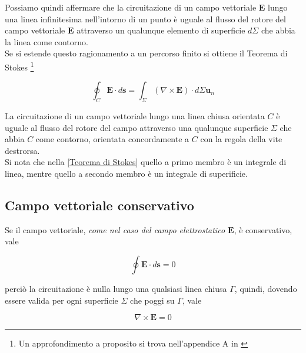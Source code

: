 Possiamo quindi affermare che la circuitazione di un campo vettoriale $\mathbf{E}$ lungo una linea infinitesima nell'intorno di un punto è uguale al flusso del rotore del campo vettoriale $\mathbf{E}$ attraverso un qualunque elemento di superficie $d \Sigma$ che abbia la linea come contorno. \\


Se si estende questo ragionamento  a un percorso finito si ottiene il Teorema di Stokes  \footnote{Un approfondimento a proposito si trova nell'appendice A in \cite{ElettromagnetismoeOnde}} 

\begin{tcolorbox}[colback=yellow!10!white, colframe=orange!70!black, boxrule=0.8pt]
\begin{equation}
    \oint_C \mathbf{E} \cdot d\mathbf{s} = \int_{\Sigma} (\nabla \times \mathbf{E}) \cdot d \Sigma \mathbf{u}_n
    \label{Teorema di Stokes}
\end{equation}
\end{tcolorbox}


La circuitazione di un campo vettoriale lungo una linea chiusa orientata $C$ è uguale al flusso del rotore del campo attraverso una qualunque superficie $\Sigma$ che abbia $C$ come contorno, orientata concordamente a $C$ con la regola della vite destrorsa. \\
Si nota che nella \ref{Teorema di Stokes} quello a primo membro è un integrale di linea, mentre quello a secondo membro è un integrale di superificie. 

\subsection{Campo vettoriale conservativo}

Se il campo vettoriale, \emph{come nel caso del campo elettrostatico $\mathbf{E}$}, è conservativo, vale 

\begin{equation*}
    \oint \mathbf{E} \cdot d \mathbf{s} = 0
\end{equation*}

perciò la circuitazione è nulla lungo una qualsiasi linea chiusa $\Gamma$, quindi, dovendo essere valida per ogni superficie $\Sigma$ che poggi su $\Gamma$, vale 

\begin{tcolorbox}[colback=yellow!10!white, colframe=orange!70!black, boxrule=0.8pt]
\begin{equation}
\nabla \times \mathbf{E} = 0 
\end{equation}
\end{tcolorbox}

